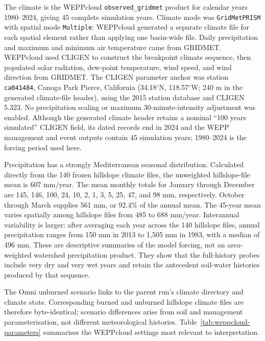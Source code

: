 \documentclass[11pt]{article}
\begin{document}
The climate is the WEPPcloud \texttt{observed\_gridmet} product for calendar
years 1980--2024, giving 45 complete simulation years. Climate mode was
\texttt{GridMetPRISM} with spatial mode \texttt{Multiple}: WEPPcloud generated
a separate climate file for each spatial element rather than applying one
basin-wide file. Daily precipitation and maximum and minimum air temperature
came from GRIDMET. WEPPcloud used CLIGEN to construct the breakpoint climate
sequence, then populated solar radiation, dew-point temperature, wind speed,
and wind direction from GRIDMET. The CLIGEN parameter anchor was station
\texttt{ca041484}, Canoga Park Pierce, California (34.18\(^{\circ}\)N,
118.57\(^{\circ}\)W; 240 m in the generated climate-file header), using the
2015 station database and CLIGEN 5.323. No precipitation scaling or maximum
30-minute-intensity adjustment was enabled. Although the generated climate
header retains a nominal ``100 years simulated'' CLIGEN field, its dated
records end in 2024 and the WEPP management and event outputs contain 45
simulation years; 1980--2024 is the forcing period used here.

Precipitation has a strongly Mediterranean seasonal distribution. Calculated
directly from the 140 frozen hillslope climate files, the unweighted
hillslope-file mean is 607 mm/year. The mean monthly totals for January through
December are 145, 146, 100, 24, 10, 2, 1, 3, 5, 25, 47, and 98 mm,
respectively. October through March supplies 561 mm, or 92.4\% of the annual
mean. The 45-year mean varies spatially among hillslope files from 485 to
688 mm/year. Interannual variability is larger: after averaging each year
across the 140 hillslope files, annual precipitation ranges from 150 mm in 2013
to 1,505 mm in 1983, with a median of 496 mm. These are descriptive summaries
of the model forcing, not an area-weighted watershed precipitation product.
They show that the full-history probes include very dry and very wet years and
retain the antecedent soil-water histories produced by that sequence.

The Omni unburned scenario links to the parent run's climate directory and
climate state. Corresponding burned and unburned hillslope climate files are
therefore byte-identical; scenario differences arise from soil and management
parameterisation, not different meteorological histories. Table~\ref{tab:weppcloud-parameters}
summarises the WEPPcloud settings most relevant to interpretation.
\end{document}
